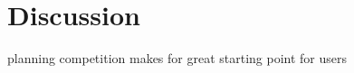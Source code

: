 \section{Discussion} \label{sec:discussion}


planning competition makes for great starting point for users

